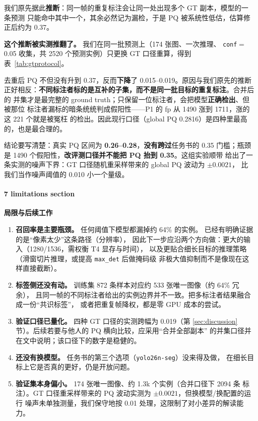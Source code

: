 \documentclass{article}
\begin{document}
我们原先据此\textbf{推断}：同一帧的重复标注会让同一处出现多个 GT 副本，模型的一条预测
只能命中其中一个，其余必然记为漏检，于是 PQ 被系统性低估，估算修正后约为 0.37。

\textbf{这个推断被实测推翻了。} 我们在同一批预测上（174 张图、一次推理、
\texttt{conf}$=$0.05 收集，共 2520 个预测实例）只更换 GT 口径重算，得到
表~\ref{tab:gtprotocol}。



去重后 PQ 不但没有升到 0.37，反而\textbf{下降}了 0.015--0.019。原因与我们原先的推断
正好相反：\textbf{不同标注者标的是互补的子集，而不是同一批目标的重复标注}。合并后的
并集才是最完整的 ground truth；只保留一位标注者，会把模型\textbf{正确检出}、但被那位
标注者漏标的暗条统统判成假阳性——P1 的 fp 从 1490 涨到 1711，涨的这 221 个就是被冤枉
的检出。因此现行口径（global PQ 0.2816）是四种里最高的，也是最合理的。

结论要写清楚：真实 PQ 区间为 \textbf{0.26--0.28}，\textbf{没有跨过}任务书的 0.35
门槛；瓶颈是 1490 个假阳性，\textbf{改评测口径并不能把 PQ 抬到 0.35}。这组实验顺带
给出了一条实测的噪声下界：GT 口径随机重采样带来的 global PQ 波动为 $\pm0.0021$，
比我们当作噪声阈值的 0.010 小一个量级。

\paragraph{7 limitations section}
\textbf{局限与后续工作}
\begin{enumerate}
  \item \textbf{召回率是主要瓶颈。} 任何阈值下模型都漏掉约 64\% 的实例。
        已经有明确证据的是“像素太少”这条路径（分辨率），
        因此下一步应沿两个方向做：更大的输入（1280/1536，需权衡 T4 显存与时间），
        以及更贴合细长目标的推理策略（滑窗切片推理，或提高 \texttt{max\_det} 后做掩码级
        非极大值抑制而不是像现在这样直接截断）。
  \item \textbf{标签侧还没有动。} 训练集 872 条样本对应约 533 张唯一图像（约 64\% 冗余），
        且同一帧的不同标注者给出的实例边界并不一致。把多标注者结果融合成一份“共识标签”，
        或者把重复帧降权，都是零 GPU 成本的尝试。
  \item \textbf{验证口径已量化。} 四种 GT 口径的实测跨幅为 0.019（第
        \ref{sec:discussion} 节）。后续若要与他人的 PQ 横向比较，应采用“合并全部副本”
        的并集口径并在文中说明；该口径下的数字是稳健的。
  \item \textbf{还没有换模型。} 任务书的第三个选项（\texttt{yolo26n-seg}）没来得及做，
        在细长目标上它是否真的更好，仍是开放问题。
  \item \textbf{验证集本身偏小。} 174 张唯一图像、约 1.3k 个实例（合并口径下 2094 条
        标注）。GT 口径重采样带来的 PQ 波动实测为 $\pm0.0021$，但换模型/换配置的运行
        噪声未单独测量，我们保守地按 0.01 处理，这限制了对小差异的解读能力。
\end{enumerate}
\end{document}

